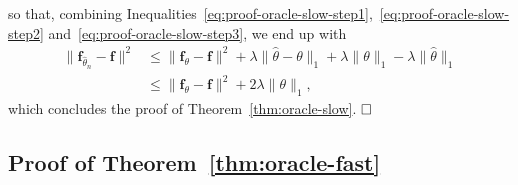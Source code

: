 \documentclass[
	fontsize=11pt, %
	twoside=false, %
	numbers=noenddot, %
]{kaobook}
\renewcommand{\bf}{{\boldsymbol f}}
\newcommand{\wh}{\widehat}
\newcommand{\norm}[1]{\| #1 \|}
\begin{document}
so that, combining Inequalities~\eqref{eq:proof-oracle-slow-step1},~\eqref{eq:proof-oracle-slow-step2} and~\eqref{eq:proof-oracle-slow-step3}, we end up with
\begin{align*}
	\norm{\bf_{\wh \theta_n} - \bf}^2 &\leq \norm{\bf_\theta - \bf}^2 
	+ \lambda \norm{\wh \theta - \theta}_1 
	+ \lambda \norm{\theta}_1 
	- \lambda \norm{\wh \theta}_1 \\
	&\leq \norm{\bf_\theta - \bf}^2 + 2 \lambda \norm{\theta}_1,
\end{align*}
which concludes the proof of Theorem~\ref{thm:oracle-slow}. $\hfill \square$


\subsection{Proof of Theorem~\ref{thm:oracle-fast}} %
\label{sub:proof_of_theorem_thm:oracle-fast}









% 




\printbibliography[heading=bibintoc, title=Bibliography] %

\end{document}
